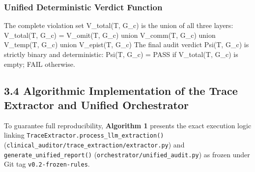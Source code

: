 \documentclass[10pt,a4paper]{article}
\begin{document}
\subsubsection*{Unified Deterministic Verdict Function}
The complete violation set V\_total(T, G\_c) is the union of all three layers:
  V\_total(T, G\_c) = V\_omit(T, G\_c) union V\_comm(T, G\_c) union V\_temp(T, G\_c) union V\_epist(T, G\_c)
The final audit verdict Psi(T, G\_c) is strictly binary and deterministic:
  Psi(T, G\_c) = PASS if V\_total(T, G\_c) is empty; FAIL otherwise.


\subsection*{3.4 Algorithmic Implementation of the Trace Extractor and Unified Orchestrator}

To guarantee full reproducibility, \textbf{Algorithm 1} presents the exact execution logic linking \texttt{TraceExtractor.process\_\allowbreak{}llm\_\allowbreak{}extraction()} (\texttt{clinical\_\allowbreak{}auditor/trace\_\allowbreak{}extraction/extractor.py}) and \texttt{generate\_\allowbreak{}unified\_\allowbreak{}report()} (\texttt{orchestrator/unified\_\allowbreak{}audit.py}) as frozen under Git tag \texttt{v0.2-frozen-rules}.
\end{document}
